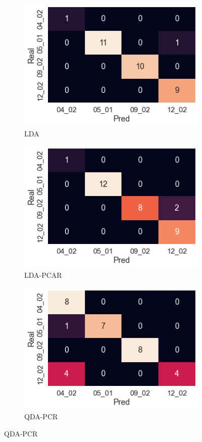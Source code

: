\documentclass[12pt]{article}
\begin{document}
\begin{figure}[htbp]
    \centering
    \begin{subfigure}[b]{0.35\textwidth}
        \caption{LDA}
        \includegraphics[width=\textwidth]{LDA.png}
    \end{subfigure}
    \begin{subfigure}[b]{0.35\textwidth}
        \caption{LDA-PCAR}
        \includegraphics[width=\textwidth]{LDAPCAR.png}
    \end{subfigure}
    \begin{subfigure}[b]{0.35\textwidth}
        \caption{QDA-PCR}
        \includegraphics[width=\textwidth]{QDAPCAR.png}

\end{subfigure}
\end{figure}
\end{document}
